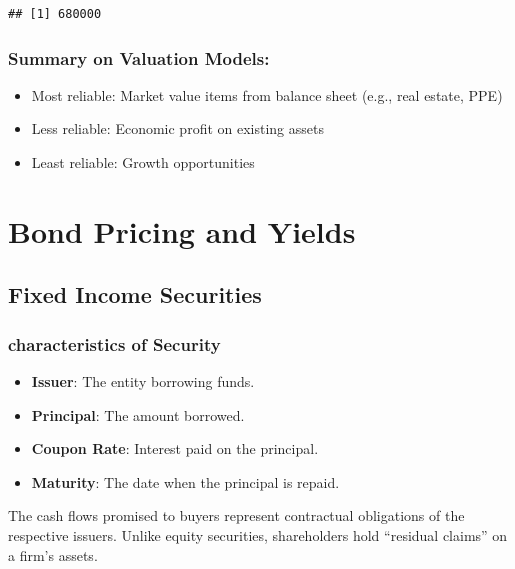 \documentclass[
]{book}
\providecommand{\tightlist}{%
  \setlength{\itemsep}{0pt}\setlength{\parskip}{0pt}}
\begin{document}
\begin{verbatim}
## [1] 680000
\end{verbatim}

\hypertarget{summary-on-valuation-models}{%
\subsection{Summary on Valuation Models:}\label{summary-on-valuation-models}}

\begin{itemize}
\tightlist
\item
  Most reliable: Market value items from balance sheet (e.g., real estate, PPE)
\item
  Less reliable: Economic profit on existing assets
\item
  Least reliable: Growth opportunities
\end{itemize}

\hypertarget{ch6}{%
\chapter{Bond Pricing and Yields}\label{ch6}}

\hypertarget{fixed-income-securities}{%
\section{Fixed Income Securities}\label{fixed-income-securities}}

\hypertarget{characteristics-of-security}{%
\subsection{characteristics of Security}\label{characteristics-of-security}}

\begin{itemize}
\tightlist
\item
  \textbf{Issuer}: The entity borrowing funds.
\item
  \textbf{Principal}: The amount borrowed.
\item
  \textbf{Coupon Rate}: Interest paid on the principal.
\item
  \textbf{Maturity}: The date when the principal is repaid.
\end{itemize}

The cash flows promised to buyers represent contractual obligations of the respective issuers.
Unlike equity securities, shareholders hold ``residual claims'' on a firm's assets.
\end{document}
